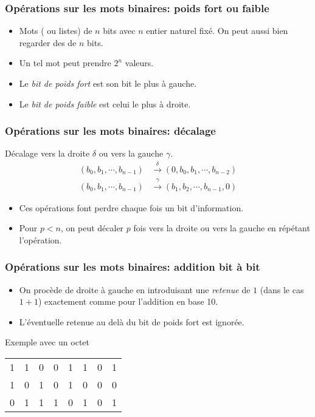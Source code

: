 



\begin{frame}
  \frametitle{Opérations sur les mots binaires: poids fort ou faible}
\begin{itemize}
  \item Mots ( ou listes) de $n$ bits avec $n$ entier naturel fixé. On peut aussi bien regarder des  de $n$ bits.
  \item Un tel mot peut prendre $2^n$ valeurs.
  \item Le \emph{bit de poids fort} est son bit le plus à gauche.
  \item Le \emph{bit de poids faible} est celui le plus à droite.
\end{itemize}
\end{frame}

\begin{frame}
  \frametitle{Opérations sur les mots binaires: décalage}
Décalage vers la droite $\delta$ ou vers la gauche $\gamma$.
  \begin{align*}
    (b_0,b_1,\cdots,b_{n-1}) &\xrightarrow{\delta} (0, b_0,b_1,\cdots,b_{n-2}) \\
    (b_0,b_1,\cdots,b_{n-1}) &\xrightarrow{\gamma} (b_1,b_2,\cdots,b_{n-1}, 0)
  \end{align*}
\begin{itemize}
  \item Ces opérations font perdre chaque fois un bit d'information.
  \item Pour $p<n$, on peut décaler $p$ fois vers la droite ou vers la gauche en répétant l'opération.
\end{itemize}
\end{frame}

\begin{frame}
  \frametitle{Opérations sur les mots binaires: addition bit à bit} 
\begin{itemize}
  \item On procède de droite à gauche en introduisant une \emph{retenue} de $1$ (dans le cas $1+1$) exactement comme pour l'addition en base 10.
  \item L'éventuelle retenue au delà du bit de poids fort est ignorée.
\end{itemize}
  Exemple avec un octet
  \begin{center}
  \begin{tabular}{cccccccc}
    1 & 1 & 0 & 0 & 1 & 1 & 0 & 1 \\ 
    1 & 0 & 1 & 0 & 1 & 0 & 0 & 0 \\ \hline
    0 & 1 & 1 & 1 & 0 & 1 & 0 & 1 \\ 
  \end{tabular}    
  \end{center}
\end{frame}

